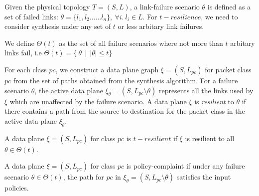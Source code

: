 Given the physical topology $T=(S,L)$, a link-failure
scenario $\theta$ is defined as a set of failed links: $\theta = \{l_1, l_2 \ldots ... l_n\},\ \forall i.\ l_i \in L$. For $t-resilience$, we need to
consider synthesis under any set of $t$ or less arbitary link failures.
\begin{mydef}
	We define $\Theta(t)$ as the set of all failure scenarios where not more than $t$
	arbitary links fail, i.e $\Theta(t) = \{ \ \theta \ \ | \ \ |\theta| \leq t\}$
\end{mydef}
For each class $pc$,
we construct a data plane graph $\xi = (S, L_{pc})$ for packet class $pc$ from the set
of paths obtained from the synthesis algorithm. For a failure scenario
$\theta$, the active data plane $\xi_\theta = (S, L_{pc} \setminus \theta)$ represents
all the links used by $\xi$ which are unaffected by the failure scenario. A data
plane $\xi$ is {\em resilient} to $\theta$ if there contains a path from the source to 
destination for the packet class in the active data plane $\xi_\theta$.
\begin{mydef}[Resilience]
	A data plane $\xi = (S, L_{pc})$ for class $pc$ is $t-resilient$ if $\xi$ is 
	resilient to all $\theta \in \Theta(t)$.
\end{mydef}
\begin{mydef}
	A data plane $\xi = (S, L_{pc})$ for class $pc$ is policy-complaint if under
	any failure scenario $\theta \in \Theta(t)$, the path for $pc$ in 
	$\xi_\theta=(S, L_{pc} \setminus \theta)$ satisfies the input policies. 
\end{mydef}
